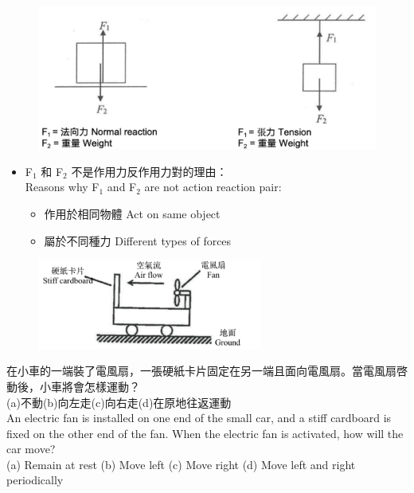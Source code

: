 \documentclass[beamer=true]{standalone}
\begin{document}
\begin{frame}{}
    \begin{figure}[h!]
        \centering
        \includegraphics[width=.8\textwidth]{assets/6a71f82b.png}
    \end{figure}
    \begin{itemize}
        \item F$_1$ 和 F$_2$ 不是作用力反作用力對的理由：\\Reasons why F$_1$ and F$_2$ are not action reaction pair:
              \begin{itemize}
                  \item 作用於相同物體 Act on same object
                  \item 屬於不同種力 Different types of forces
              \end{itemize}
    \end{itemize}
\end{frame}



\begin{eg}
    \begin{figure}[h!]
        \centering
        \includegraphics[width=0.66\textwidth]{assets/323c58f6.png}
    \end{figure}
    在小車的一端裝了電風扇，一張硬紙卡片固定在另一端且面向電風扇。當電風扇啓動後，小車將會怎樣運動？\\(a)不動(b)向左走(c)向右走(d)在原地往返運動
    \\An electric fan is installed on one end of the small car, and a stiff cardboard is fixed on the other end of the fan. When the electric fan is activated, how will the car move? \\(a) Remain at rest (b) Move left (c) Move right (d) Move left and right periodically

\end{eg}
\end{document}
